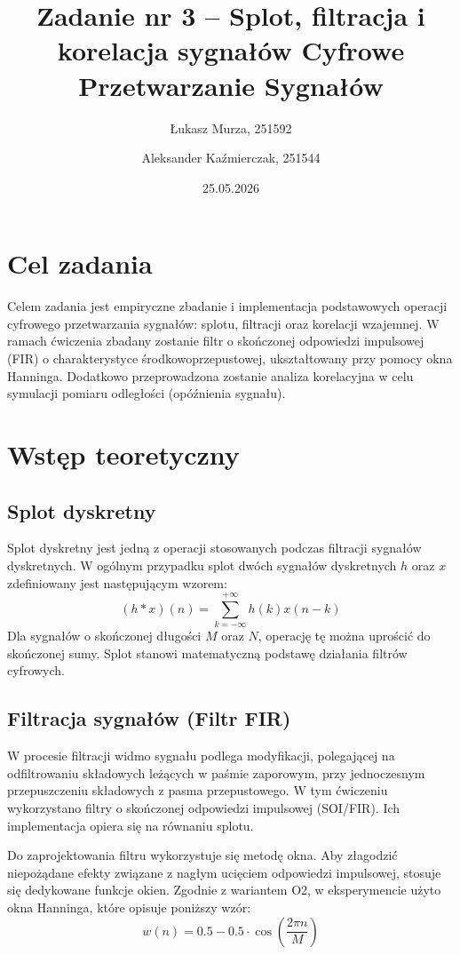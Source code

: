 \documentclass[12pt]{article}
\title{{\bf Zadanie nr 3 -- Splot, filtracja i korelacja sygnałów}\linebreak
Cyfrowe Przetwarzanie Sygnałów}
\author{Łukasz Murza, 251592 \and Aleksander Kaźmierczak, 251544}
\date{25.05.2026}
\begin{document}
\maketitle
\thispagestyle{empty}
\newpage
\setcounter{page}{1}

\section{Cel zadania}
Celem zadania jest empiryczne zbadanie i implementacja podstawowych operacji cyfrowego przetwarzania sygnałów: splotu, filtracji oraz korelacji wzajemnej. W ramach ćwiczenia zbadany zostanie filtr o skończonej odpowiedzi impulsowej (FIR) o charakterystyce środkowoprzepustowej, ukształtowany przy pomocy okna Hanninga. Dodatkowo przeprowadzona zostanie analiza korelacyjna w celu symulacji pomiaru odległości (opóźnienia sygnału).

\section{Wstęp teoretyczny}

\subsection{Splot dyskretny}
Splot dyskretny jest jedną z operacji stosowanych podczas filtracji sygnałów dyskretnych. W ogólnym przypadku splot dwóch sygnałów dyskretnych $h$ oraz $x$ zdefiniowany jest następującym wzorem:
$$(h*x)(n) = \sum_{k=-\infty}^{+\infty} h(k)x(n-k)$$ 
Dla sygnałów o skończonej długości $M$ oraz $N$, operację tę można uprościć do skończonej sumy. Splot stanowi matematyczną podstawę działania filtrów cyfrowych.

\subsection{Filtracja sygnałów (Filtr FIR)}
W procesie filtracji widmo sygnału podlega modyfikacji, polegającej na odfiltrowaniu składowych leżących w paśmie zaporowym, przy jednoczesnym przepuszczeniu składowych z pasma przepustowego. W tym ćwiczeniu wykorzystano filtry o skończonej odpowiedzi impulsowej (SOI/FIR). Ich implementacja opiera się na równaniu splotu. 

Do zaprojektowania filtru wykorzystuje się metodę okna. Aby złagodzić niepożądane efekty związane z nagłym ucięciem odpowiedzi impulsowej, stosuje się dedykowane funkcje okien. Zgodnie z wariantem O2, w eksperymencie użyto okna Hanninga, które opisuje poniższy wzór:
$$w(n)=0.5-0.5 \cdot \cos\left(\frac{2\pi n}{M}\right)$$ 
\end{document}
